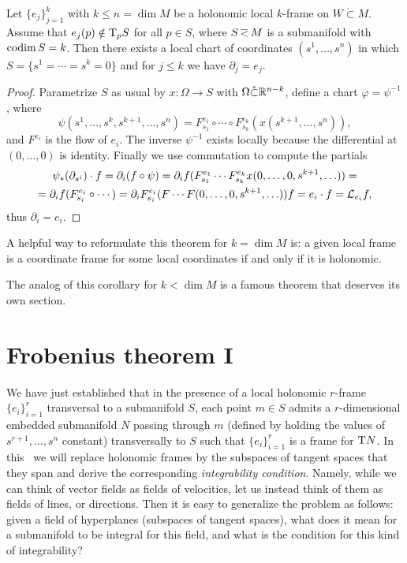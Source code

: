 \begin{thm}\label{thm rectification}
    Let $\{e_j\}_{j=1}^k$ with $k\leq n=\dim M$ be a holonomic local $k$-frame on $W\mathring{\subset}M$. Assume that $e_j(p)\notin \mathrm{T}_p S$ for all $p\in S$, where $S\emb M$ is a submanifold with $\operatorname{codim} S=k$. Then there exists a local chart of coordinates $(s^1,\ldots,s^n)$ in which $S=\{s^1=\cdots=s^k=0\}$ and for $j\leq k$ we have $\partial_j=e_j$.
\end{thm}
\begin{proof}
    Parametrize $S$ as usual by $x:\Omega\to S$ with $\Omega\mathring{\subset}\mathbb{R}^{n-k}$, define a chart $\varphi=\psi^{-1}$, where
    \[\psi(s^1,\ldots,s^k,s^{k+1},\ldots,s^n)=F^{e_1}_{s_1}\circ\cdots\circ F^{e_k}_{s_k}(x(s^{k+1},\ldots,s^n)),\]
    and $F^{e_i}$ is the flow of $e_i$. The inverse $\psi^{-1}$ exists locally because the differential at $(0,\ldots,0)$ is identity. Finally we use commutation to compute the partials
    \begin{multline}
        \psi_\ast (\partial_{s^i})\cdot f=\partial_i(f\circ\psi)=\partial_i f(F^{e_1}_{s_1}\cdots F^{e_k}_{s_k} x(0,\ldots,0,s^{k+1},\ldots))=\\=\partial_i f(F^{e_i}_{s_i}\circ\cdots )=\partial_i F^{e_i}_{s_i}(F\cdots F(0,\ldots,0,s^{k+1},\ldots))f=e_i\cdot f=\mathcal{L}_{e_i}f,
    \end{multline}
    thus $\partial_i=e_i$.
\end{proof}

\begin{cor}
    A helpful way to reformulate this theorem for $k=\dim M$ is: a given local frame is a coordinate frame for some local coordinates if and only if it is holonomic.
\end{cor}

The analog of this corollary for $k<\dim M$ is a famous theorem that deserves its own section.





\section{Frobenius theorem I}\label{sec: frobenius i}

We have just established that in the presence of a local holonomic $r$-frame $\{e_i\}_{i=1}^r$ transversal to a submanifold $S$, each point $m\in S$ admits a $r$-dimensional embedded submanifold $N$ passing through $m$ (defined by holding the values of $s^{r+1},\ldots,s^n$ constant) transversally to $S$ such that $\{e_i\}_{i=1}^r$ is a frame for $\mathrm{T} N$. In this \sect\ we will replace holonomic frames by the subspaces of tangent spaces that they span and derive the corresponding \emph{integrability condition}. Namely, while we can think of vector fields as fields of velocities, let us instead think of them as fields of lines, or directions. Then it is easy to generalize the problem as follows: given a field of hyperplanes (subspaces of tangent spaces), what does it mean for a submanifold to be integral for this field, and what is the condition for this kind of integrability?

